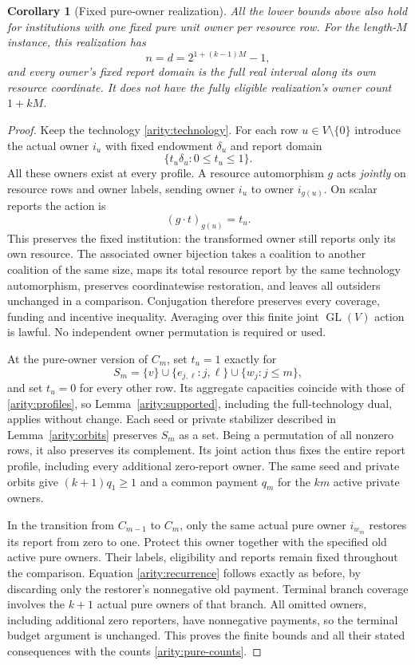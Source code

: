 \documentclass[11pt]{article}
\newtheorem{corollary}[theorem]{Corollary}
\theoremstyle{definition}\newtheorem{definition}[theorem]{Definition}
\theoremstyle{remark}\newtheorem{remark}[theorem]{Remark}
\begin{document}
\begin{corollary}[Fixed pure-owner realization]
\label{arity:pure}
All the lower bounds above also hold for institutions with one fixed pure
unit owner per resource row.  For the length-$M$ instance, this realization
has
\begin{equation}
  n=d=2^{1+(k-1)M}-1,
  \label{arity:pure-counts}
\end{equation}
and every owner's fixed report domain is the full real interval along its
own resource coordinate.  It does not have the fully eligible realization's
owner count $1+kM$.
\end{corollary}

\begin{proof}
Keep the technology \eqref{arity:technology}.  For each row
$u\in V\setminus\{0\}$ introduce the actual owner $i_u$ with fixed
endowment $\delta_u$ and report domain
\[
  \{t_u\delta_u:0\leq t_u\leq1\}.
\]
All these owners exist at every profile.  A resource automorphism $g$ acts
\emph{jointly} on resource rows and owner labels, sending owner $i_u$ to
owner $i_{g(u)}$.  On scalar reports the action is
\[
  (g\cdot t)_{g(u)}=t_u.
\]
This preserves the fixed institution: the transformed owner still reports
only its own resource.  The associated owner bijection takes a coalition
to another coalition of the same size, maps its total resource report by
the same technology automorphism, preserves coordinatewise restoration,
and leaves all outsiders unchanged in a comparison.  Conjugation therefore
preserves every coverage, funding and incentive inequality.  Averaging over
this finite joint $\operatorname{GL}(V)$ action is lawful.  No independent
owner permutation is required or used.

At the pure-owner version of $C_m$, set $t_u=1$ exactly for
\[
  S_m=\{v\}\cup\{e_{j,\ell}:j,\ell\}
                 \cup\{w_j:j\leq m\},
\]
and set $t_u=0$ for every other row.  Its aggregate capacities coincide with
those of \eqref{arity:profiles}, so Lemma~\ref{arity:supported}, including
the full-technology dual, applies without change.  Each seed or private
stabilizer described in Lemma~\ref{arity:orbits} preserves $S_m$ as a set.
Being a permutation of all nonzero rows, it also preserves its complement.
Its joint action thus fixes the entire report profile, including every
additional zero-report owner.  The same seed and private orbits give
$(k+1)q_1\geq1$ and a common payment $q_m$ for the $km$ active private owners.

In the transition from $C_{m-1}$ to $C_m$, only the same actual pure owner
$i_{w_m}$ restores its report from zero to one.  Protect this owner together
with the specified old active pure owners.  Their labels, eligibility and
reports remain fixed throughout the comparison.  Equation
\eqref{arity:recurrence} follows exactly as before, by discarding only the
restorer's nonnegative old payment.  Terminal branch coverage involves
the $k+1$ actual pure owners of that branch.  All omitted owners, including
additional zero reporters, have nonnegative payments, so the terminal
budget argument is unchanged.  This proves the finite bounds and all their
stated consequences with the counts \eqref{arity:pure-counts}.
\end{proof}
\end{document}
